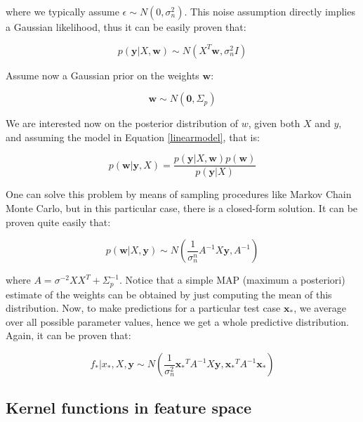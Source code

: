 \documentclass[10pt,a4paper,twoside]{book}
\begin{document}
where we typically assume $\epsilon \sim N(0, \sigma_n^2)$. This noise assumption directly implies a Gaussian likelihood, thus it can be easily proven that:

\begin{equation}
p(\boldsymbol{y}|X, \boldsymbol{w}) \sim N (X^T\boldsymbol{w}, \sigma_n^2 I)
\end{equation}

Assume now a Gaussian prior on the weights $\boldsymbol{w}$:

\begin{equation}
\label{wprior}
\boldsymbol{w} \sim N(\boldsymbol{0}, \Sigma_p)
\end{equation}

We are interested now on the posterior distribution of $w$, given both $X$ and $y$, and assuming the model in Equation \ref{linearmodel}, that is:

\begin{equation}
p(\boldsymbol{w}|\boldsymbol{y}, X) = \dfrac{p(\boldsymbol{y}|X, \boldsymbol{w}) p(\boldsymbol{w})}{p(\boldsymbol{y}| X)}
\end{equation}

One can solve this problem by means of sampling procedures like Markov Chain Monte Carlo, but in this particular case, there is a closed-form solution. It can be proven quite easily that:

\begin{equation}
p(\boldsymbol{w}|X, \boldsymbol{y}) \sim N \left(\dfrac{1}{\sigma_n^n}A^{-1}X\boldsymbol{y}, A^{-1}\right)
\end{equation}

where $A = \sigma^{-2}XX^T + \Sigma_p^{-1}$. Notice that a simple MAP (maximum a posteriori) estimate of the weights can be obtained by just computing the mean of this distribution. Now, to make predictions for a particular test case $\boldsymbol{x_{*}}$, we average over all possible parameter values, hence we get a whole predictive distribution. Again, it can be proven that:

\begin{equation}
f_{*}|x_{*}, X, \boldsymbol{y} \sim N\left(\dfrac{1}{\sigma_n^2}\boldsymbol{x_{*}}^T A^{-1}X\boldsymbol{y}, \boldsymbol{x_*}^T A^{-1} \boldsymbol{x}_{*}\right)
\end{equation} 

\subsection{Kernel functions in feature space}
\end{document}
